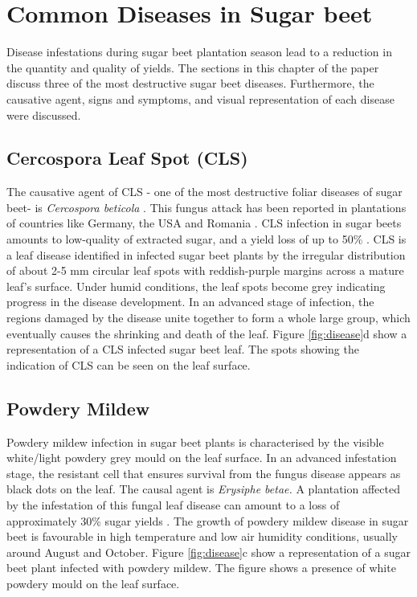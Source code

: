 \chapter{Common Diseases in Sugar beet}
\label{cha:Fundamentals}	

Disease infestations during sugar beet plantation season lead to a reduction in the quantity and quality of yields. The sections in this chapter of the paper discuss three of the most destructive sugar beet diseases. Furthermore, the causative agent, signs and symptoms, and visual representation of each disease were discussed.

\section{Cercospora Leaf Spot (CLS)}
 The causative agent of CLS - one of the most destructive foliar diseases of sugar beet- is \textit{Cercospora beticola} \cite{stewart1999phylogenetic}. This fungus attack has been reported in plantations of countries like Germany, the USA and Romania \cite{khan2005evaluating, gummert2015variety, iamandei2013biological}. CLS infection in sugar beets amounts to low-quality of extracted sugar, and a yield loss of up to 50\%  \cite{rossi2000effect}.
CLS is a leaf disease identified in infected sugar beet plants by the irregular distribution of about 2-5 mm circular leaf spots with reddish-purple margins across a mature leaf’s surface. Under humid conditions, the leaf spots become grey indicating progress in the disease development. In an advanced stage of infection, the regions damaged by the disease unite together to form a whole large group, which eventually causes the shrinking and death of the leaf. Figure \ref{fig:disease}d show a representation of a CLS infected sugar beet leaf. The spots showing the indication of CLS can be seen on the leaf surface.


\section{Powdery Mildew} 
Powdery mildew infection in sugar beet plants is characterised by the visible white/light powdery grey mould on the leaf surface. In an advanced infestation stage, the resistant cell that ensures survival from the fungus disease appears as black dots on the leaf. The causal agent is \textit{Erysiphe betae.} A plantation affected by the infestation of this fungal leaf disease can amount to a loss of approximately 30\% sugar yields \cite{francis2002sugar}.
The growth of powdery mildew disease in sugar beet is favourable in high temperature and low air humidity conditions, usually around August and October. Figure \ref{fig:disease}c show a representation of a sugar beet plant infected with powdery mildew. The figure shows a presence of white powdery mould on the leaf surface.

